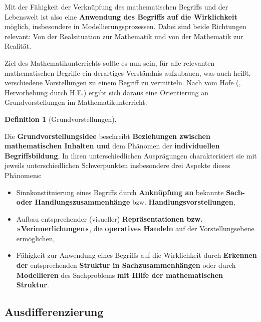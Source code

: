 \documentclass[
]{scrbook}
\providecommand{\tightlist}{%
  \setlength{\itemsep}{0pt}\setlength{\parskip}{0pt}}
\theoremstyle{definition}
\newtheorem{definition}{Definition}[chapter]
\theoremstyle{definition}
\theoremstyle{definition}
\theoremstyle{definition}
\theoremstyle{remark}
\begin{document}
Mit der Fähigkeit der Verknüpfung des mathematischen Begriffs und der Lebenswelt ist also eine \textbf{Anwendung des Begriffs auf die Wirklichkeit} möglich, insbesondere in Modellierungsprozessen. Dabei sind beide Richtungen relevant: Von der Realsituation zur Mathematik und von der Mathematik zur Realität.

Ziel des Mathematikunterrichts sollte es nun sein, für alle relevanten mathematischen Begriffe ein derartiges Verständnis aufzubauen, was auch heißt, verschiedene Vorstellungen zu einem Begriff zu vermitteln. Nach vom Hofe (, Hervorhebung durch H.E.) ergibt sich daraus eine Orientierung an Grundvorstellungen im Mathematikunterricht:

\begin{definition}[Grundvorstellungen]
\protect\hypertarget{def:Grundvorstellungen}{}\label{def:Grundvorstellungen}

Die \textbf{Grundvorstellungsidee} beschreibt \textbf{Beziehungen zwischen mathematischen Inhalten und} dem Phänomen der \textbf{individuellen Begriffsbildung}. In ihren unterschiedlichen Ausprägungen charakterisiert sie mit jeweils unterschiedlichen Schwerpunkten insbesondere drei Aspekte dieses Phänomens:

\begin{itemize}
\tightlist
\item
  Sinnkonstituierung eines Begriffs durch \textbf{Anknüpfung an} bekannte \textbf{Sach- oder Handlungszusammenhänge} bzw. \textbf{Handlungsvorstellungen},
\item
  Aufbau entsprechender (visueller) \textbf{Repräsentationen bzw. »Verinnerlichungen«}, die \textbf{operatives Handeln} auf der Vorstellungsebene ermöglichen,
\item
  Fähigkeit zur Anwendung eines Begriffs auf die Wirklichkeit durch \textbf{Erkennen der} entsprechenden \textbf{Struktur in Sachzusammenhängen} oder durch \textbf{Modellieren} des Sachproblems \textbf{mit Hilfe der mathematischen Struktur}.
\end{itemize}

\end{definition}

\subsection{Ausdifferenzierung}\label{ausdifferenzierung}
\end{document}

